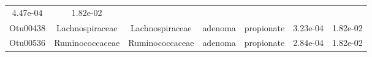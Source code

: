 \documentclass[11pt,]{article}
\begin{document}
\begin{longtable}[]{@{}ccccccc@{}}
\begin{minipage}[t]{0.09\columnwidth}
4.47e-04\strut
\end{minipage} & \begin{minipage}[t]{0.09\columnwidth}\centering\strut
1.82e-02\strut
\end{minipage}\tabularnewline
\begin{minipage}[t]{0.09\columnwidth}\centering\strut
Otu00438\strut
\end{minipage} & \begin{minipage}[t]{0.17\columnwidth}\centering\strut
Lachnospiraceae\strut
\end{minipage} & \begin{minipage}[t]{0.17\columnwidth}\centering\strut
Lachnospiraceae\strut
\end{minipage} & \begin{minipage}[t]{0.09\columnwidth}\centering\strut
adenoma\strut
\end{minipage} & \begin{minipage}[t]{0.11\columnwidth}\centering\strut
propionate\strut
\end{minipage} & \begin{minipage}[t]{0.09\columnwidth}\centering\strut
3.23e-04\strut
\end{minipage} & \begin{minipage}[t]{0.09\columnwidth}\centering\strut
1.82e-02\strut
\end{minipage}\tabularnewline
\begin{minipage}[t]{0.09\columnwidth}\centering\strut
Otu00536\strut
\end{minipage} & \begin{minipage}[t]{0.17\columnwidth}\centering\strut
Ruminococcaceae\strut
\end{minipage} & \begin{minipage}[t]{0.17\columnwidth}\centering\strut
Ruminococcaceae\strut
\end{minipage} & \begin{minipage}[t]{0.09\columnwidth}\centering\strut
adenoma\strut
\end{minipage} & \begin{minipage}[t]{0.11\columnwidth}\centering\strut
propionate\strut
\end{minipage} & \begin{minipage}[t]{0.09\columnwidth}\centering\strut
2.84e-04\strut
\end{minipage} & \begin{minipage}[t]{0.09\columnwidth}\centering\strut
1.82e-02\strut
\end{minipage}\tabularnewline

\end{longtable}
\end{document}
